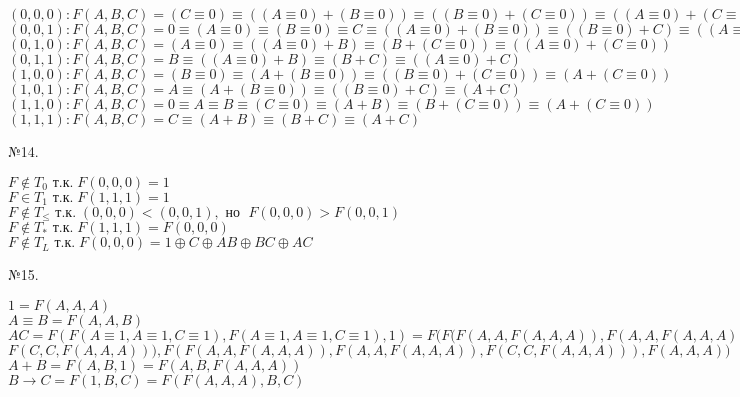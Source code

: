 \documentclass[a4paper,10pt]{report} %
\begin{document}
\begin{flushleft}
$ (0,0,0): F(A,B,C) = (C\equiv 0) \equiv ((A\equiv 0)+(B\equiv 0)) \equiv ((B\equiv 0)+(C\equiv 0)) \equiv ((A\equiv 0)+(C\equiv 0)) $  \\
$ (0,0,1): F(A,B,C) = 0\equiv (A\equiv 0) \equiv (B\equiv 0) \equiv C \equiv ((A\equiv 0)+(B\equiv 0)) \equiv ((B\equiv 0)+C) \equiv ((A\equiv 0)+C) $ \\
$ (0,1,0): F(A,B,C) = (A\equiv 0) \equiv ((A\equiv 0)+B) \equiv (B+(C\equiv 0)) \equiv ((A\equiv 0)+(C\equiv 0)) $ \\
$ (0,1,1): F(A,B,C) = B \equiv ((A\equiv 0)+B) \equiv (B+C) \equiv ((A\equiv 0)+C) $ \\
$ (1,0,0): F(A,B,C) = (B\equiv 0) \equiv (A+(B\equiv 0)) \equiv ((B\equiv 0)+(C\equiv 0)) \equiv (A+(C\equiv 0)) $ \\
$ (1,0,1): F(A,B,C) = A \equiv (A+(B\equiv 0)) \equiv ((B\equiv 0)+C) \equiv (A+C) $ \\
$ (1,1,0): F(A,B,C) = 0\equiv A \equiv B \equiv (C\equiv 0) \equiv (A+B) \equiv (B+(C\equiv 0)) \equiv (A+(C\equiv 0)) $\\
$ (1,1,1): F(A,B,C) = C \equiv (A+B) \equiv (B+C) \equiv (A+C) $ \\
\end{flushleft}
\begin{center} 
№14.  
\end{center}
\begin{flushleft}
$F \notin{T_0} \text{ т.к.}\; F(0,0,0)=1 $ \\
$F \in{T_1} \text{ т.к.}\; F(1,1,1)=1 $ \\
$F \notin{T_\leq} \text{ т.к.}\; (0,0,0) < (0,0,1), \text{ но }\; F(0,0,0)>F(0,0,1) $ \\
$F \notin{T_*} \text{ т.к.}\; F(1,1,1)=F(0,0,0) $ \\
$F \notin{T_L} \text{ т.к.}\; F(0,0,0)= 1 \oplus C \oplus AB \oplus BC \oplus AC $ \\
\end{flushleft}
\begin{center} 
№15.  
\end{center}
\begin{flushleft}
$1 = F(A, A, A) $ \\
$A \equiv B  = F(A, A, B) $ \\
$ AC = F(F(A\equiv1, A\equiv1, C\equiv1), F(A\equiv1, A\equiv1, C\equiv1), 1)= F( F( F(A, A, F(A, A, A)), F(A, A, F(A, A, A)), $ \\ 
$          F(C, C, F(A, A, A))), F(F(A, A, F(A, A, A)), F(A, A, F(A, A, A)), F(C, C, F(A, A, A))), F(A,A,A)) $ \\
$A + B = F(A, B, 1) = F(A, B, F(A, A, A)) $ \\
$B \rightarrow C = F(1, B, C) = F(F(A, A, A), B, C) $ \\
\end{flushleft}
\end{document}
